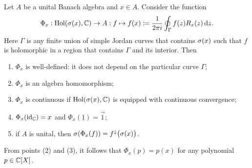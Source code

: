\begin{theorem} 
\label{holomorphicFunctionalCalculus} \label{holomorphicSpectralMapping}
Let $A$ be a unital Banach algebra and $x\in A$. Consider the function
\[ \Phi_x: \operatorname{Hol}(\sigma(x),\mathbb{C}) \to A: f\mapsto f(x)\coloneqq \frac{1}{2\pi i}\oint_\Gamma f(z)R_x(z)\operatorname{d \!}{z}. \]
Here $\Gamma$ is any finite union of simple Jordan curves that contains $\sigma(x)$ such that $f$ is holomorphic in a region that contains $\Gamma$ and its interior. Then
\begin{enumerate}
\item $\Phi_x$ is well-defined: it does not depend on the particular curve $\Gamma$;
\item $\Phi_x$ is an algebra homomorphism;
\item $\Phi_x$ is continuous if $\operatorname{Hol}(\sigma(x),\mathbb{C})$ is equipped with continuous convergence;
\item $\Phi_x(\operatorname{id}_{\mathbb{C}}) = x$ and $\Phi_x(\underline{1}) = \vec{1}$;
\item if $A$ is unital, then $\sigma(\Phi_x(f)) = f^\downarrow\big(\sigma(x)\big)$.
\end{enumerate}
\end{theorem}
From points (2) and (3), it follows that $\Phi_x(p) = p(x)$ for any polynomial $p\in \mathbb{C}[X]$.

